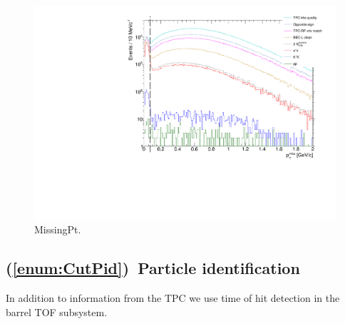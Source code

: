 \begin{figure}[ht!]
\centering%
\includegraphics[width=0.633\linewidth,page=1]{graphics/eventSelection/MissingPt.pdf}%
\caption{MissingPt.}\label{fig:MissingPt}%
\end{figure}


\subsection{(\ref{enum:CutPid})~Particle identification}

In addition to information from the TPC we use time of hit detection in the barrel TOF subsystem. 






